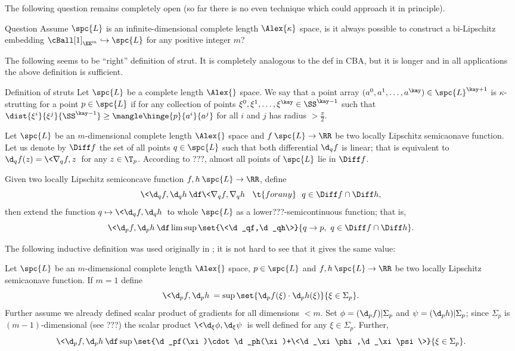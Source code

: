 The following question remains completely open (so far there is no even technique which could approach it in principle).

\begin{thm}{Question}
Assume $\spc{L}$ is an infinite-dimensional complete length $\Alex{\kappa}$ space, 
is it always possible to construct a bi-Lipschitz embedding $\cBall[1]_{\EE^m}\hookrightarrow \spc{L}$ for any positive integer $m$?
\end{thm}

The following seems to be ``right'' definition of strut.
It is completely analogous to the def in CBA,
but it is  longer and in all applications the above definition is sufficient.%

\begin{thm}{Definition of struts}\label{def:strut-I+}
Let $\spc{L}$ be a complete length $\Alex{}$ space.
We say that a point array $(a^0,a^1,\dots,a^\kay)\in\spc{L}^{\kay+1}$
is $\kappa$-strutting for a point $p\in\spc{L}$ if 
for any collection of points $\xi^0,\xi^1,\dots,\xi^\kay\in \SS^{\kay-1}$
such that $\dist{\xi^i}{\xi^j}{\SS^{\kay-1}}\ge \mangle\hinge{p}{a^i}{a^j}$ for all $i$ and $j$ 
has radius $>\tfrac\pi2$.
\end{thm} 

Let 
$\spc{L}$ be an $m$-dimensional complete length $\Alex{}$ space
and $f\:\spc{L}\to \RR$ be two locally Lipschitz semicaonave function.
Let us denote by $\Diff f$ the set of all points $q\in\spc{L}$ such that
both differential $\d_qf$ is linear;
that is equivalent to $\d_qf(z)=\<\nabla_qf,z\>$ for any $z\in\T_p$.
According to ???, almost all points of $\spc{L}$ lie in $\Diff f$.

Given two locally Lipschitz semiconcave function $f,h\:\spc{L}\to \RR$,
define 
\[
\<\d_qf,\d_qh\>
\df
\<\nabla_qf,\nabla_q h\>
\ \ \t{for any}\ \ 
q\in \Diff f\cap\Diff h,\]
then extend the function $q\mapsto \<\d_qf,\d_qh\>$ to whole $\spc{L}$ as a lower???-semicontinuous function;
that is,
\[
\<\d_pf,\d_ph\>
\df
\limsup\set{\<\d_qf,\d_qh\>}{q\to p,\ q\in \Diff f\cap \Diff h}.
\]

The following inductive definition was used originally in \cite[???]{perelman:DC}; 
it is not hard to see that it gives the same value:

Let $\spc{L}$ be an $m$-dimensional complete length $\Alex{}$ space, 
$p\in\spc{L}$ 
and $f,h\:\spc{L}\to \RR$ be two locally Lipschitz semicaonave function.
If $m=1$ define 
\[
\<\d_p f,\d_ph\>
=
\sup\set{\d_pf(\xi)\cdot\d_ph(\xi)}{\xi\in\Sigma_p}.
\]
Further assume we already defined scalar product of gradients for all dimensions $<m$.
Set $\phi=(\d_pf)|\Sigma_p$ and $\psi=(\d_ph)|\Sigma_p$;
since $\Sigma_p$ is $(m-1)$-dimensional (see ???) the scalar product
$\<\d_\xi\phi,\d_\xi\psi\>$ is well defined for any $\xi\in\Sigma_p$.
Further, 
\[
\<\d_pf,\d_ph\>
\df
\sup
\set{\d_pf(\xi)\cdot\d_ph(\xi)+\<\d_\xi\phi,\d_\xi\psi\>}%
{\xi\in\Sigma_p}.
\]


